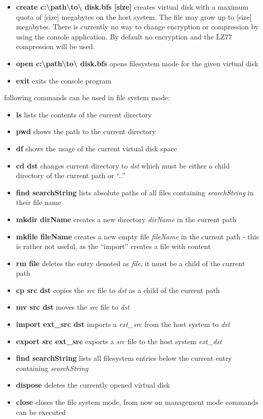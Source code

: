 \begin{itemize}
  \item{\textbf{create c:\textbackslash path\textbackslash to\textbackslash
  disk.bfs [size]}} creates virtual disk with a maximum quota of [size]
  megabytes on the host system. The file may grow up to [size] megabytes. There
  is currently no way to change encryption or compression by using the console
  application. By default no encryption and the LZ77 compression will be used.
  \item {\textbf{open c:\textbackslash path\textbackslash to\textbackslash
  disk.bfs}} opens filesystem mode for the given virtual disk
  \item {\textbf{exit}} exits the console program
\end{itemize}

following commands can be used in file system mode:

\begin{itemize}
  \item {\textbf{ls}} lists the contents of the current directory
  \item {\textbf{pwd}} shows the path to the current directory
  \item {\textbf{df}} shows the usage of the current virtual disk space
  \item {\textbf{cd dst}} changes current directory to \textit{dst} which must
  be either a child directory of the current path or ``..''
  \item {\textbf{find searchString}} lists absolute paths of all files
  containing \textit{searchString} in their file name
  \item {\textbf{mkdir dirName}} creates a new directory \textit{dirName} in the
  current path
  \item {\textbf{mkfile fileName}} creates a new empty file \textit{fileName} in
  the current path - this is rather not useful, as the ``import'' creates a
  file with content
  \item {\textbf{rm file}} deletes the entry denoted as \textit{file}, it must
  be a child of the current path
  \item {\textbf{cp src dst}} copies the \textit{src} file to \textit{dst} as a
  child of the current path
  \item {\textbf{mv src dst}} moves the \textit{src} file to \textit{dst}
  \item {\textbf{import ext\_src dst}} imports a \textit{ext\_src} from the
  host system to \textit{dst}
  \item {\textbf{export src ext\_src}} exports a \textit{src} file to the host
  system \textit{ext\_dst}
  \item {\textbf{find searchString}} lists all filesystem entries below the
  current entry containing \textit{searchString}
  \item {\textbf{dispose}} deletes the currently opened virtual disk
  \item {\textbf{close}} closes the file system mode, from now on management mode
  commands can be executed
\end{itemize}


